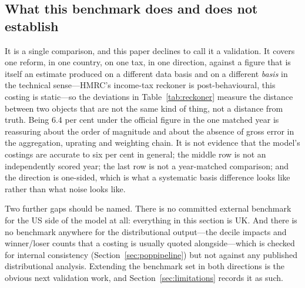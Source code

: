 \subsection{What this benchmark does and does not establish}

It is a single comparison, and this paper declines to call it a validation. It covers one reform, in one country, on one tax, in one direction, against a figure that is itself an estimate produced on a different data basis and on a different \emph{basis} in the technical sense---HMRC's income-tax reckoner is post-behavioural, this costing is static---so the deviations in Table~\ref{tab:reckoner} measure the distance between two objects that are not the same kind of thing, not a distance from truth. Being 6.4 per cent under the official figure in the one matched year is reassuring about the order of magnitude and about the absence of gross error in the aggregation, uprating and weighting chain. It is not evidence that the model's costings are accurate to six per cent in general; the middle row is not an independently scored year; the last row is not a year-matched comparison; and the direction is one-sided, which is what a systematic basis difference looks like rather than what noise looks like.

Two further gaps should be named. There is no committed external benchmark for the US side of the model at all: everything in this section is UK. And there is no benchmark anywhere for the distributional output---the decile impacts and winner/loser counts that a costing is usually quoted alongside---which is checked for internal consistency (Section~\ref{sec:poppipeline}) but not against any published distributional analysis. Extending the benchmark set in both directions is the obvious next validation work, and Section~\ref{sec:limitations} records it as such.
